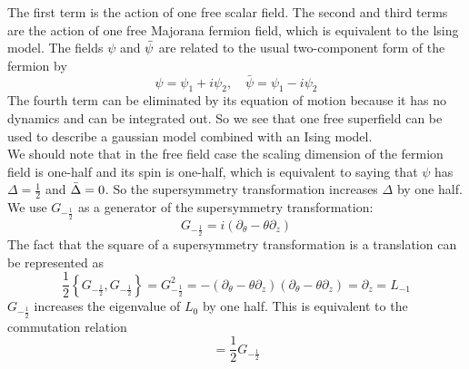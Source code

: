 \documentclass[12pt]{article}
\theoremstyle{definition}
\begin{document}
The first term is the action of one free scalar field. The second and third terms are the action of one free Majorana fermion field, which is equivalent to the lsing model. The fields $\psi$ and $\Bar{\psi}$ are related to the usual two-component form of the fermion by
\begin{equation}
    \psi=\psi_1+i\psi_2,\quad\bar{\psi}=\psi_1-i\psi_2
\end{equation}
The fourth term can be eliminated by its equation of motion because it has no dynamics and can be integrated out. So we see that one free superfield can be used to describe a gaussian model combined with an Ising model.\\
We should note that in the free field case the scaling dimension of the fermion field is one-half and its spin is one-half, which is equivalent to saying that $\psi$ has $\Delta=\frac{1}{2}$ and $\Bar{\Delta} = 0$. So the supersymmetry transformation increases $\Delta$ by one half. We use $G_{-\frac{1}{2}}$ as a generator of the supersymmetry transformation:
\begin{equation}
    G_{-\frac{1}{2}}=i(\partial_\theta-\theta\partial_z)
\end{equation}
The fact that the square of a supersymmetry transformation is a translation can be represented as
\begin{equation}
    \frac{1}{2}\left\{G_{-\frac{1}{2}},G_{-\frac{1}{2}}\right\}=G_{-\frac{1}{2}}^2=-(\partial_\theta-\theta\partial_z)(\partial_\theta-\theta\partial_z)=\partial_z=L_{-1}
\end{equation}
$G_{-\frac{1}{2}}$ increases the eigenvalue of $L_0$ by one half. This is equivalent to the commutation relation
\begin{equation}
    [L_0,G_{-\frac{1}{2}}]=\frac{1}{2}G_{-\frac{1}{2}}
\end{equation}
\end{document}
